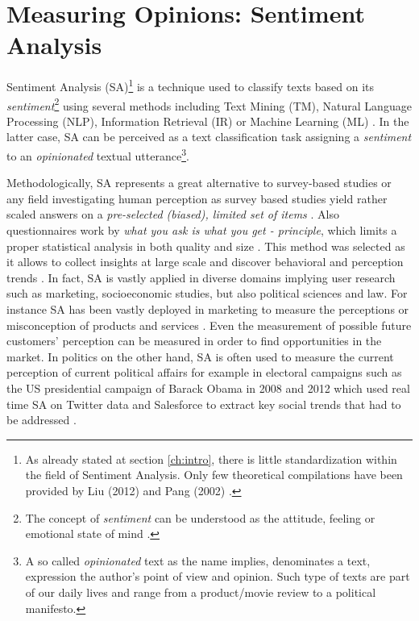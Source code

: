 \documentclass[
	a4paper,
	pdftex,
	12pt,	
	footinclude=true,
	fleqn,
	final,
	]{report}%
\begin{document}
\vspace{-0.45cm}
\section{Measuring Opinions: Sentiment Analysis}
\label{sec:intro_sa}
\vspace{-0.3cm}

Sentiment Analysis (SA)\footnote{As already stated at section \ref{ch:intro}, there is little standardization 
within the field of Sentiment Analysis. Only few theoretical compilations have been provided by Liu (2012) \cite{Liu2012,Liu2012a} 
and Pang (2002) \cite{Pang2008}.} is a technique used to classify texts based on 
its \emph{sentiment}\footnote{The concept of \emph{sentiment} can be understood as 
the attitude, feeling or emotional state of mind \cite{Liu2012,Fang2015}.} using several methods including 
Text Mining (TM), Natural Language Processing (NLP), Information Retrieval (IR) or Machine Learning (ML) \cite{Fang2015}.
In the latter case, SA can be perceived as a text classification task assigning a \emph{sentiment} to an \emph{opinionated} 
textual utterance\footnote{A so called \emph{opinionated} text as the name implies, denominates a text, expression the author's 
point of view and opinion. Such type of texts are part of our daily lives and range from a product/movie review to a 
political manifesto.}. 

Methodologically, SA represents a great alternative to survey-based studies
or any field investigating human perception \cite{Taylor2012} as
survey based studies yield rather scaled answers on a 
\emph{pre-selected (biased), limited set of items} \cite{Shapiro1996}.
Also questionnaires work by \emph{what you ask is what you get - principle}, 
which limits a proper statistical analysis in both quality and size \cite{Mehl2006}. 
This method was selected as it allows to collect insights at large scale and 
discover behavioral and perception trends \cite{Pang2008}. 
In fact, SA is vastly applied in diverse domains implying user research such as marketing, 
socioeconomic studies, but also political sciences and law. For instance 
SA has been vastly deployed in marketing to measure the perceptions or 
misconception of products and services \cite{Ravindran2015}.
Even the measurement of possible future customers' perception can be measured in order to find 
opportunities in the market. In politics on the other hand, SA is often used to measure the 
current perception of current political affairs for example in electoral campaigns 
such as the US presidential campaign of Barack Obama in 2008 and 2012 which used 
real time SA on Twitter data and Salesforce to extract key social trends that had 
to be addressed \cite{Wang2012}. 
\end{document}
